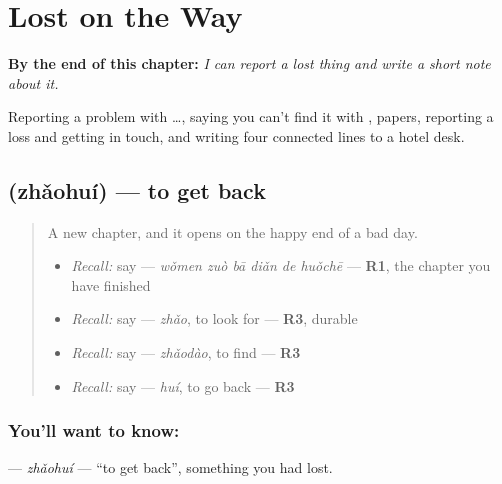 
\chapter{Lost on the Way}
\label{ch:zh-lost-on-the-way}

\begin{chapteropening}
\textbf{By the end of this chapter:} \emph{I can report a lost thing and write a short note about it.}

Reporting a problem with …, saying you can't find it with , papers, reporting a loss and getting in touch, and writing four connected lines to a hotel desk.
\end{chapteropening}

\section[\texorpdfstring{\zh{找回} (zhǎohuí)}{找回 (zhǎohuí)}]{ (zhǎohuí) — to get back}

\label{lesson:ZH-C285-zhaohui}



\begin{quote}
A new chapter, and it opens on the happy end of a bad day.

\begin{itemize}
\raggedright
  \item \emph{Recall:} say  — \emph{wǒmen zuò bā diǎn de huǒchē} — \textbf{R1}, the chapter you have finished
  \item \emph{Recall:} say  — \emph{zhǎo}, to look for — \textbf{R3}, durable
  \item \emph{Recall:} say  — \emph{zhǎodào}, to find — \textbf{R3}
  \item \emph{Recall:} say  — \emph{huí}, to go back — \textbf{R3}
\end{itemize}
\end{quote}

\subsection*{You'll want to know: }
\textbf{} — \emph{zhǎohuí} — \textquotedblleft{}to get back\textquotedblright{}, something you had lost.

